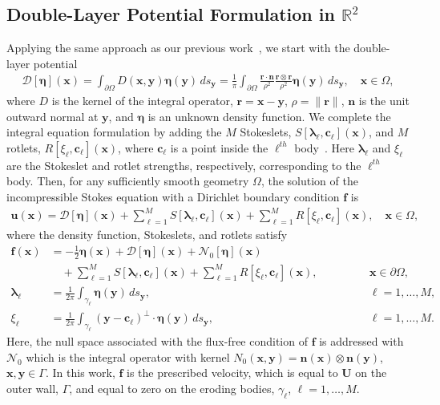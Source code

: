 \documentclass[preprint, superscriptaddress, notitlepage]{revtex4-1}
\newcommand{\bd}{{\partial}}
\newcommand{\cc}{{\mathbf{c}}}
\newcommand{\DDD}{{\boldsymbol{\mathcal D}}}
\newcommand{\eeta}{{\boldsymbol\eta}}
\newcommand{\ff}{{\mathbf{f}}}
\newcommand{\llambda}{{\boldsymbol\lambda}}
\newcommand{\nn}{{\mathbf{n}}}
\newcommand{\NN}{{\mathcal{N}}}
\newcommand{\rr}{{\mathbf{r}}}
\newcommand{\RR}{{\mathbb{R}}}
\newcommand{\uu}{{\mathbf{u}}}
\newcommand{\UU}{{\mathbf{U}}}
\newcommand{\xx}{{\mathbf{x}}}
\newcommand{\yy}{{\mathbf{y}}}
\begin{document}
\subsection{Double-Layer Potential Formulation in $\RR^2$}
Applying the same approach as our previous work~\citep{qua-moo2018}, we
start with the double-layer potential 
\begin{align}
  \DDD[\eeta](\xx) = \int_{\bd\Omega} D(\xx,\yy) \eeta(\yy)\, ds_\yy = 
  \frac{1}{\pi}\int_{\bd\Omega} 
    \frac{\rr \cdot \nn}{\rho^2} \frac{\rr \otimes \rr}{\rho^2}
    \eeta(\yy) \, ds_\yy, \quad \xx \in \Omega,
  \label{eqn:velocityDLP}
\end{align}
where $D$ is the kernel of the integral operator, $\rr = \xx - \yy$,
$\rho = \|\rr\|$, $\nn$ is the unit outward normal at $\yy$, and $\eeta$
is an unknown density function.  We complete the integral equation
formulation by adding the $M$ Stokeslets,
$S[\llambda_\ell,\cc_\ell](\xx)$, and $M$ rotlets,
$R[\xi_\ell,\cc_\ell](\xx)$, where $\cc_\ell$ is a point inside the
$\ell^{th}$ body~\citep{pow-mir1987}.  Here $\llambda_\ell$ and
$\xi_\ell$ are the Stokeslet and rotlet strengths, respectively,
corresponding to the $\ell^{th}$ body.  Then, for any sufficiently
smooth geometry $\Omega$, the solution of the incompressible Stokes
equation with a Dirichlet boundary condition $\ff$ is
\begin{align}
  \uu(\xx) = \DDD[\eeta](\xx) + 
    \sum_{\ell=1}^M S[\llambda_\ell,\cc_\ell](\xx) + 
    \sum_{\ell=1}^M R[\xi_\ell,\cc_\ell](\xx), \quad \xx \in \Omega,
\end{align}
where the density function, Stokeslets, and rotlets satisfy
\begin{subequations}
\label{eqn:BIE}
\begin{alignat}{3}
  \ff(\xx) &= -\frac{1}{2}\eeta(\xx) + \DDD[\eeta](\xx) + 
    \NN_0[\eeta](\xx) \nonumber \\
    &\quad + \sum_{\ell=1}^M S[\llambda_\ell,\cc_\ell](\xx) + 
    \sum_{\ell=1}^M R[\xi_\ell,\cc_\ell](\xx), 
    \quad &&\qquad\xx \in \bd\Omega, \\
  \llambda_\ell &= \frac{1}{2\pi} \int_{\gamma_\ell} 
    \eeta(\yy)\, ds_\yy, &&\qquad \ell = 1,\ldots,M, \\
  \xi_\ell &= \frac{1}{2\pi} \int_{\gamma_\ell}
    (\yy - \cc_\ell)^\perp \cdot \eeta(\yy)\, ds_\yy, 
    &&\qquad \ell = 1,\ldots,M.
\end{alignat}
\end{subequations}
Here, the null space associated with the flux-free condition of $\ff$ is
addressed with  $\NN_0$ which is the integral operator with kernel
$N_0(\xx,\yy) = \nn(\xx) \otimes \nn(\yy)$, $\xx,\yy \in \Gamma$.  In
this work, $\ff$ is the prescribed velocity, which is equal to $\UU$ on
the outer wall, $\Gamma$, and equal to zero on the eroding bodies,
$\gamma_\ell$, $\ell=1,\ldots,M$.
\end{document}

